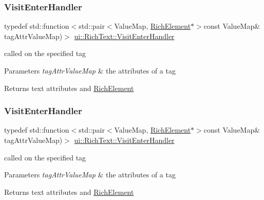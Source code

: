 \subsubsection{\texorpdfstring{Visit\+Enter\+Handler}{VisitEnterHandler}\hspace{0.1cm}{\footnotesize\ttfamily [1/2]}}
{\footnotesize\ttfamily typedef std\+::function$<$std\+::pair$<$Value\+Map, \hyperlink{classui_1_1RichElement}{Rich\+Element}$\ast$$>$const Value\+Map\& tag\+Attr\+Value\+Map)$>$ \hyperlink{classui_1_1RichText_a195114ba2bddc97248b8a0c400d489f7}{ui\+::\+Rich\+Text\+::\+Visit\+Enter\+Handler}}



called on the specified tag 


\begin{DoxyParams}{Parameters}
{\em tag\+Attr\+Value\+Map} & the attributes of a tag \\
\hline
\end{DoxyParams}
\begin{DoxyReturn}{Returns}
text attributes and \hyperlink{classui_1_1RichElement}{Rich\+Element} 
\end{DoxyReturn}
\mbox{\label{classui_1_1RichText_a195114ba2bddc97248b8a0c400d489f7}} 
\subsubsection{\texorpdfstring{Visit\+Enter\+Handler}{VisitEnterHandler}\hspace{0.1cm}{\footnotesize\ttfamily [2/2]}}
{\footnotesize\ttfamily typedef std\+::function$<$std\+::pair$<$Value\+Map, \hyperlink{classui_1_1RichElement}{Rich\+Element}$\ast$$>$const Value\+Map\& tag\+Attr\+Value\+Map)$>$ \hyperlink{classui_1_1RichText_a195114ba2bddc97248b8a0c400d489f7}{ui\+::\+Rich\+Text\+::\+Visit\+Enter\+Handler}}



called on the specified tag 


\begin{DoxyParams}{Parameters}
{\em tag\+Attr\+Value\+Map} & the attributes of a tag \\
\hline
\end{DoxyParams}
\begin{DoxyReturn}{Returns}
text attributes and \hyperlink{classui_1_1RichElement}{Rich\+Element} 
\end{DoxyReturn}


